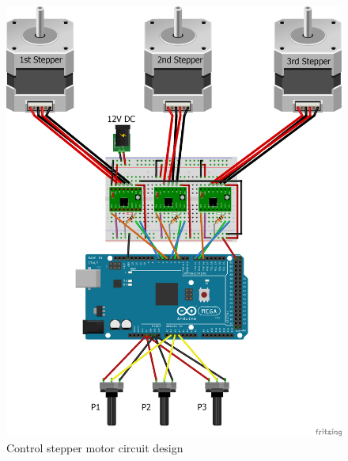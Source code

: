 \begin{figure}[H]
	\centering
	\includegraphics[width=\maxwidth{15cm}, keepaspectratio]{Chapters/Fig/stepper_coltroler_circuit.png}
	\caption{Control stepper motor circuit design}
	\label{fig:stepper_coltroler_circuit}
\end{figure}

